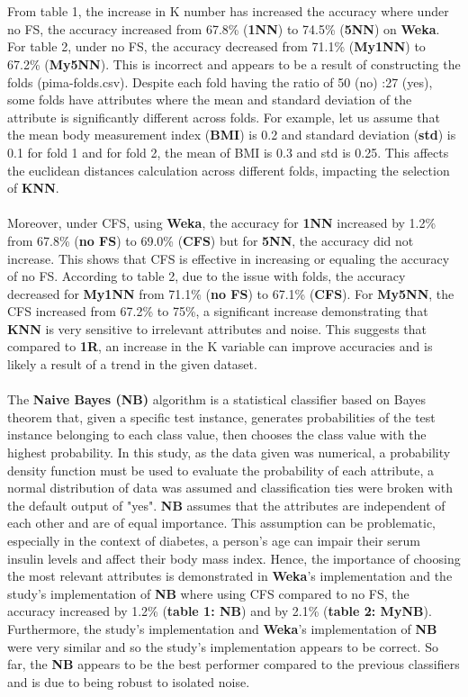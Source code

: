 \documentclass{article}
\begin{document}
    \\
    \\
    From table 1, the increase in K number has increased the accuracy where under no FS, the accuracy increased from 67.8\% (\textbf{1NN}) to 74.5\% (\textbf{5NN}) on \textbf{Weka}. For table 2, under no FS, the accuracy decreased from 71.1\% (\textbf{My1NN}) to 67.2\% (\textbf{My5NN}). This is incorrect and appears to be a result of constructing the folds (pima-folds.csv). Despite each fold having the ratio of 50 (no) :27 (yes), some folds have attributes where the mean and standard deviation of the attribute is significantly different across folds. For example, let us assume that the mean body measurement index (\textbf{BMI}) is 0.2 and standard deviation (\textbf{std}) is 0.1 for fold 1 and for fold 2, the mean of BMI is 0.3 and std is 0.25. This affects the euclidean distances calculation across different folds, impacting the selection of \textbf{KNN}. 
    \\
    \\
    Moreover, under CFS, using \textbf{Weka}, the accuracy for \textbf{1NN} increased by 1.2\% from 67.8\% (\textbf{no FS}) to 69.0\% (\textbf{CFS}) but for \textbf{5NN}, the accuracy did not increase. This shows that CFS is effective in increasing or equaling the accuracy of no FS. According to table 2, due to the issue with folds, the accuracy decreased for \textbf{My1NN} from 71.1\% (\textbf{no FS}) to 67.1\% (\textbf{CFS}). For \textbf{My5NN}, the CFS increased from 67.2\% to 75\%, a significant increase demonstrating that \textbf{KNN} is very sensitive to irrelevant attributes and noise. This suggests that compared to \textbf{1R}, an increase in the K variable can improve accuracies and is likely a result of a trend in the given dataset.
    \\
    \\
    The \textbf{Naive Bayes (NB)} algorithm is a statistical classifier based on Bayes theorem that, given a specific test instance, generates probabilities of the test instance belonging to each class value, then chooses the class value with the highest probability. In this study, as the data given was numerical, a probability density function must be used to evaluate the probability of each attribute, a normal distribution of data was assumed and classification ties were broken with the default output of "yes".  \textbf{NB} assumes that the attributes are independent of each other and are of equal importance. This assumption can be problematic, especially in the context of diabetes, a person's age can impair their serum insulin levels and affect their body mass index. Hence, the importance of choosing the most relevant attributes is demonstrated in \textbf{Weka}'s implementation and the study's implementation of \textbf{NB} where using CFS compared to no FS, the accuracy increased by 1.2\% (\textbf{table 1: NB}) and by 2.1\% (\textbf{table 2: MyNB}). Furthermore, the study's implementation and \textbf{Weka}'s implementation of \textbf{NB} were very similar and so the study's implementation appears to be correct. So far, the \textbf{NB} appears to be the best performer compared to the previous classifiers and is due to being robust to isolated noise.
\end{document}
